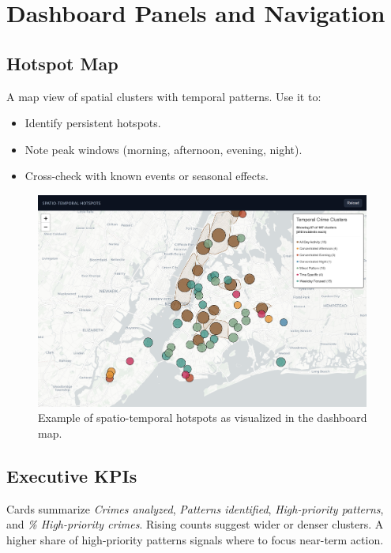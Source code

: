 \documentclass[11pt]{article}
\begin{document}
\section{Dashboard Panels and Navigation}

\subsection{Hotspot Map}
A map view of spatial clusters with temporal patterns. Use it to:
\begin{itemize}[leftmargin=*]
  \item Identify persistent hotspots.
  \item Note peak windows (morning, afternoon, evening, night).
  \item Cross-check with known events or seasonal effects.
\end{itemize}

\begin{figure}[H]
  \centering
  \includegraphics[width=0.98\textwidth]{spatio-temporal_clusters.png}
  \caption{Example of spatio-temporal hotspots as visualized in the dashboard map.}
\end{figure}

\subsection{Executive KPIs}
Cards summarize \emph{Crimes analyzed}, \emph{Patterns identified}, \emph{High-priority patterns}, and \emph{\% High-priority crimes}. Rising counts suggest wider or denser clusters. A higher share of high-priority patterns signals where to focus near-term action.
\end{document}
